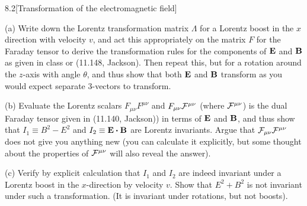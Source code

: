 \documentclass[12pt]{article}
\begin{document}
\begin{problem}{8.2}[Transformation of the electromagnetic field]

(a) Write down the Lorentz transformation matrix $\Lambda$ for a Lorentz boost
in the $x$ direction with velocity $v$, and act this appropriately on the matrix
$F$ for the Faraday tensor to derive the transformation rules for the components
of $\vb{E}$ and $\vb{B}$ as given in class or (11.148, Jackson). Then repeat
this, but for a rotation around the $z$-axis with angle $\theta$, and thus show
that both $\vb{E}$ and $\vb{B}$ transform as you would expect separate 3-vectors
to transform.

(b) Evaluate the Lorentz scalars $F_{\mu\nu}F^{\mu\nu}$ and
$F_{\mu\nu}\mathcal{F}^{\mu\nu}$ (where $\mathcal{F}^{\mu\nu}$) is the dual Faraday tensor given
in (11.140, Jackson)) in terms of $\vb{E}$ and $\vb{B}$, and thus show that
$I_1\equiv B^2-E^2$ and $I_2\equiv \vb{E}\vdot\vb{B}$ are Lorentz invariants.
Argue that $\mathcal{F}_{\mu\nu}\mathcal{F}^{\mu\nu}$ does not give you anything new (you can
calculate it explicitly, but some thought about the properties of $\mathcal{F}^{\mu\nu}$
will also reveal the answer).

(c) Verify by explicit calculation that $I_1$ and $I_2$ are indeed invariant
under a Lorentz boost in the $x$-direction by velocity $v$. Show that $E^2+B^2$
is not invariant under such a transformation. (It is invariant under rotations,
but not boosts).


\end{problem}
\end{document}
